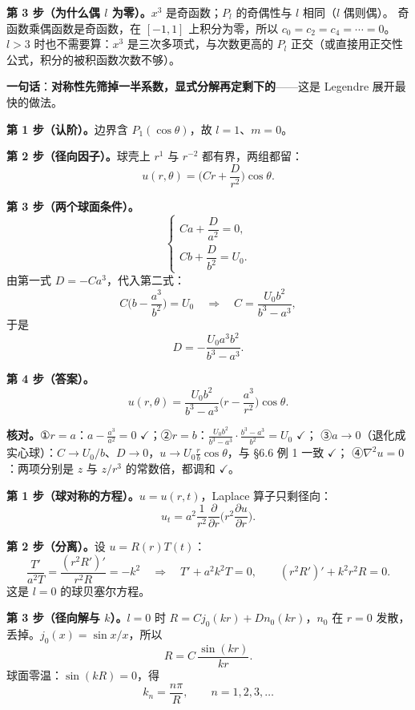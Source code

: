 \textbf{第 3 步（为什么偶 $l$ 为零）。}$x^3$ 是奇函数；$P_l$ 的奇偶性与 $l$ 相同（$l$ 偶则偶）。
奇函数乘偶函数是奇函数，在 $[-1,1]$ 上积分为零，所以 $c_0=c_2=c_4=\cdots=0$。
$l>3$ 时也不需要算：$x^3$ 是三次多项式，与次数更高的 $P_l$ 正交（或直接用正交性公式，积分的被积函数次数不够）。

\textbf{一句话}：\textbf{对称性先筛掉一半系数，显式分解再定剩下的}——这是 Legendre 展开最快的做法。


\textbf{第 1 步（认阶）。}边界含 $P_1(\cos\theta)$，故 $l=1$、$m=0$。

\textbf{第 2 步（径向因子）。}球壳上 $r^1$ 与 $r^{-2}$ 都有界，两组都留：
\[
u(r,\theta)=\Big(Cr+\frac{D}{r^2}\Big)\cos\theta .
\]

\textbf{第 3 步（两个球面条件）。}
\[
\begin{cases}
Ca+\dfrac{D}{a^2}=0,\\[6pt]
Cb+\dfrac{D}{b^2}=U_0 .
\end{cases}
\]
由第一式 $D=-Ca^3$，代入第二式：
\[
C\Big(b-\frac{a^3}{b^2}\Big)=U_0
\quad\Longrightarrow\quad
C=\frac{U_0b^2}{b^3-a^3},
\]
于是
\[
D=-\frac{U_0a^3b^2}{b^3-a^3}.
\]

\textbf{第 4 步（答案）。}
\[
u(r,\theta)=\frac{U_0b^2}{b^3-a^3}\Big(r-\frac{a^3}{r^2}\Big)\cos\theta .
\]

\textbf{核对。}①$r=a$：$a-\frac{a^3}{a^2}=0$ $\checkmark$；②$r=b$：$\frac{U_0b^2}{b^3-a^3}\cdot\frac{b^3-a^3}{b^2}=U_0$ $\checkmark$；
③$a\to0$（退化成实心球）：$C\to U_0/b$、$D\to0$，$u\to U_0\frac{r}{b}\cos\theta$，与 §6.6 例 1 一致 $\checkmark$；
④$\nabla^2u=0$：两项分别是 $z$ 与 $z/r^3$ 的常数倍，都调和 $\checkmark$。


\textbf{第 1 步（球对称的方程）。}$u=u(r,t)$，Laplace 算子只剩径向：
\[
u_t=a^2\frac{1}{r^2}\frac{\partial}{\partial r}\Big(r^2\frac{\partial u}{\partial r}\Big).
\]

\textbf{第 2 步（分离）。}设 $u=R(r)T(t)$：
\[
\frac{T'}{a^2T}=\frac{(r^2R')'}{r^2R}=-k^2
\quad\Longrightarrow\quad
T'+a^2k^2T=0,\qquad
(r^2R')'+k^2r^2R=0 .
\]
这是 $l=0$ 的球贝塞尔方程。

\textbf{第 3 步（径向解与 $k$）。}$l=0$ 时 $R=Cj_0(kr)+Dn_0(kr)$，$n_0$ 在 $r=0$ 发散，丢掉。$j_0(x)=\sin x/x$，所以
\[
R=C\,\frac{\sin(kr)}{kr}.
\]
球面零温：$\sin(kR)=0$，得
\[
k_n=\frac{n\pi}{R},\qquad n=1,2,3,\dots
\]

